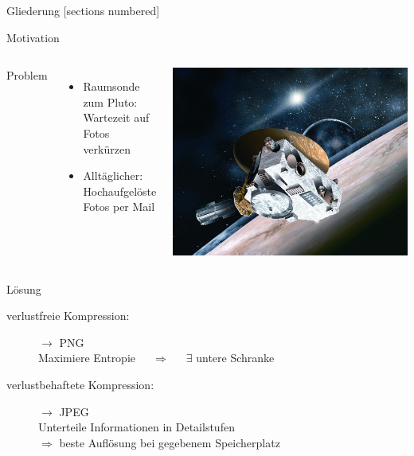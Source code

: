 \begin{frame}{Gliederung}
[sections numbered]
\tableofcontents[hideallsubsections]
\end{frame}

{
\begin{frame}{Motivation}
	\begin{columns}[c,onlytextwidth]
		\alert{Problem}
		\begin{itemize}
			\item Raumsonde zum Pluto:\\
			Wartezeit auf Fotos verkürzen\pause
			\item Alltäglicher:\\
			Hochaufgelöste Fotos per Mail
		\end{itemize}\pause[1]
		
		\includegraphics[width=\textwidth]{newHorizons.jpg}
	\end{columns}\vspace{-1mm}\pause[3]
	\alert{Lösung}\vspace{-2mm}
	\begin{description}
		\item [verlustfreie Kompression:]  \hspace{48mm}$\rightarrow$ PNG\\
		\hspace{-14.4mm}Maximiere Entropie\ \ \ $\Rightarrow$\ \ \ $\exists$ untere Schranke\pause
		\item [verlustbehaftete Kompression:] \hspace{39mm}$\rightarrow$ JPEG\\
		\hspace{-14.4mm}Unterteile Informationen in Detailstufen\\
		\hspace{-20.2mm}$\Rightarrow$\hspace{1.1mm} beste Auflösung bei gegebenem Speicherplatz
	\end{description}
\end{frame}}

